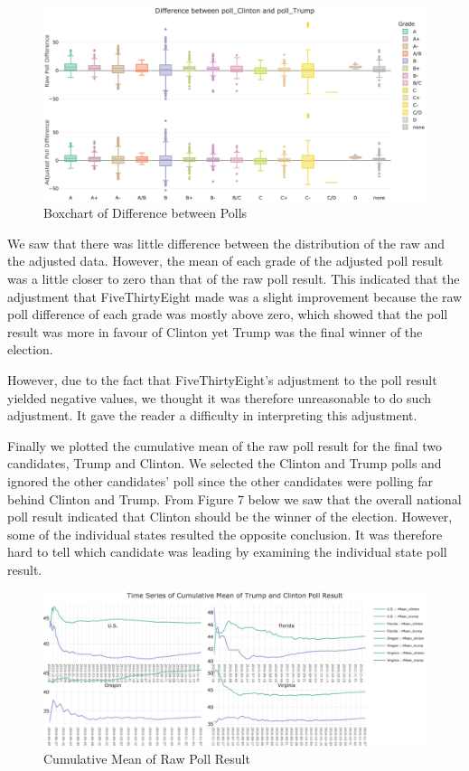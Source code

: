 \documentclass[
  11pt,
]{article}
\begin{document}
\begin{figure}

{\centering \includegraphics{./Figures/boxchart} 

}

\caption{Boxchart of Difference between Polls}\label{fig:unnamed-chunk-21}
\end{figure}

We saw that there was little difference between the distribution of the
raw and the adjusted data. However, the mean of each grade of the
adjusted poll result was a little closer to zero than that of the raw
poll result. This indicated that the adjustment that FiveThirtyEight
made was a slight improvement because the raw poll difference of each
grade was mostly above zero, which showed that the poll result was more
in favour of Clinton yet Trump was the final winner of the election.

However, due to the fact that FiveThirtyEight's adjustment to the poll
result yielded negative values, we thought it was therefore unreasonable
to do such adjustment. It gave the reader a difficulty in interpreting
this adjustment.

Finally we plotted the cumulative mean of the raw poll result for the
final two candidates, Trump and Clinton. We selected the Clinton and
Trump polls and ignored the other candidates' poll since the other
candidates were polling far behind Clinton and Trump. From Figure 7
below we saw that the overall national poll result indicated that
Clinton should be the winner of the election. However, some of the
individual states resulted the opposite conclusion. It was therefore
hard to tell which candidate was leading by examining the individual
state poll result.

\begin{figure}

{\centering \includegraphics{./Figures/cMeanchart} 

}

\caption{Cumulative Mean of Raw Poll Result}\label{fig:unnamed-chunk-23}
\end{figure}
\end{document}
